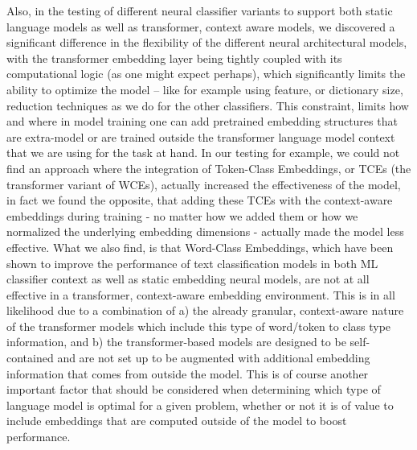 \documentclass[final]{clv2025-revised}
\begin{document}
Also, in the testing of different neural classifier variants to support both static language models as well as transformer, context aware models, we discovered a significant difference in the flexibility of the different neural architectural models, with the transformer embedding layer being tightly coupled with its computational logic (as one might expect perhaps), which significantly limits the ability to optimize the model – like for example using feature, or dictionary size, reduction techniques as we do for the other classifiers. This constraint, limits how and where in model training one can add pretrained embedding structures that are extra-model or are trained outside the transformer language model context that we are using for the task at hand.  In our testing for example, we could not find an approach where the integration of Token-Class Embeddings, or TCEs (the transformer variant of WCEs), actually increased the effectiveness of the model, in fact we found the opposite, that adding these TCEs with the context-aware embeddings during training - no matter how we added them or how we normalized the underlying embedding dimensions - actually made the model less effective. What we also find, is that Word-Class Embeddings, which have been shown to improve the performance of text classification models in both ML classifier context as well as static embedding neural models, are not at all effective in a transformer, context-aware embedding environment. This is in all likelihood due to a combination of a) the already granular, context-aware nature of the transformer models which include this type of word/token to class type information, and b) the transformer-based models are designed to be self-contained and are not set up to be augmented with additional embedding information that comes from outside the model. This is of course another important factor that should be considered when determining which type of language model is optimal for a given problem, whether or not it is of value to include embeddings that are computed outside of the model to boost performance.
\end{document}
